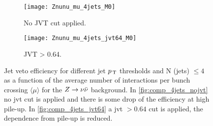 \begin{figure}[!h]
  \centering
  \begin{subfigure}[t]{.48\linewidth}
    \texttt{[image: Znunu\_mu\_4jets\_M0]}
    \caption{No JVT cut applied.}
    \label{fig:znunu_4jets_jvt64}
  \end{subfigure}
  \begin{subfigure}[t]{.48\linewidth}
    \texttt{[image: Znunu\_mu\_4jets\_jvt64\_M0]}
    \caption{JVT > 0.64.}
    \label{fig:comp_4jets_jvt64_1}
  \end{subfigure}
  \caption{Jet veto efficiency for different jet $p_\mathrm{\, T}$ thresholds and N (jets)
    $\leq 4$ as a function of the average number of interactions per bunch
    crossing $\langle \mu \rangle$ for the $Z \rightarrow \nu \bar{\nu}$ background. In
    \cref{fig:comp_4jets_nojvt} no \gls{jvt} cut is applied and there is some
    drop of the efficiency at high pile-up. In \cref{fig:comp_4jets_jvt64} a
    \gls{jvt} $> 0.64$ cut is applied, the dependence from pile-up is reduced.}
  \label{fig:jet_veto_comparison}
\end{figure}
